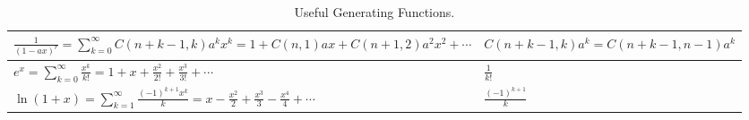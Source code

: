 \documentclass{article}
\begin{document}
\begin{table}[h!]
\begin{tabular}{|>{\centering\arraybackslash}m{5cm}|>{\centering\arraybackslash}m{8cm}|}
            \hline
            $\displaystyle \frac{1}{(1-ax)^r} = \sum_{k=0}^\infty C(n+k-1,k)a^kx^k = 1 + C(n,1)ax + C(n+1,2)a^2x^2 + \cdots $ & $\displaystyle C(n+k-1,k)a^k = C(n+k-1,n-1)a^k$ \\
            \hline
            $\displaystyle e^x = \sum_{k=0}^\infty \frac{x^k}{k!} = 1 + x + \frac{x^2}{2!} + \frac{x^3}{3!} + \cdots $ & $\displaystyle \frac{1}{k!}$ \\
            \hline
            $\displaystyle \ln(1+x) = \sum_{k=1}^\infty \frac{(-1)^{k+1}x^k}{k} = x - \frac{x^2}{2} + \frac{x^3}{3} - \frac{x^4}{4} + \cdots $ & $\displaystyle \frac{(-1)^{k+1}}{k}$ \\
            \hline
        \end{tabular}
        \caption{Useful Generating Functions.}
    \end{table}
\end{document}
